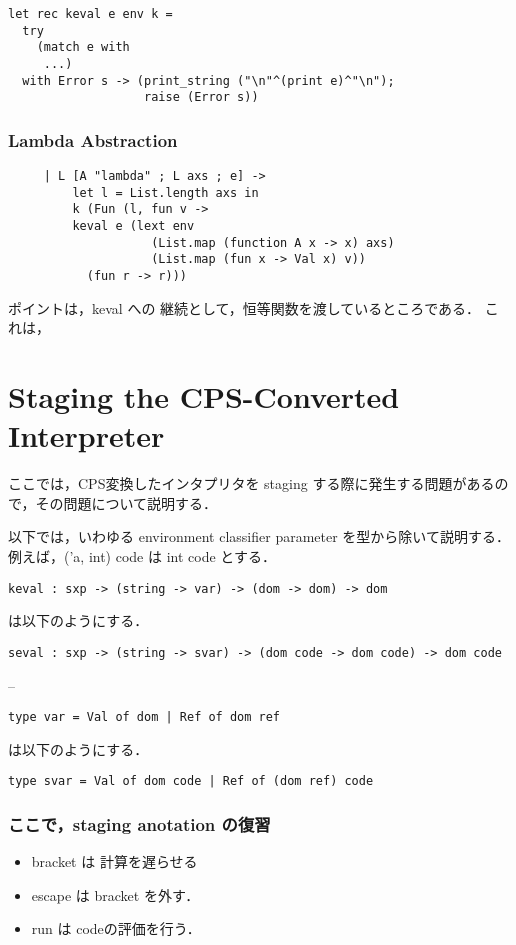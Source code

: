 \documentclass[10pt,a4paper]{jarticle}
\theoremstyle{definition}
\begin{document}
{\small
\begin{verbatim}
let rec keval e env k =
  try
    (match e with
     ...)
  with Error s -> (print_string ("\n"^(print e)^"\n");
                   raise (Error s))
\end{verbatim}}

\subsubsection{Lambda Abstraction}
{\small
\begin{verbatim}
     | L [A "lambda" ; L axs ; e] ->
	     let l = List.length axs in
         k (Fun (l, fun v ->
         keval e (lext env
                    (List.map (function A x -> x) axs)
                    (List.map (fun x -> Val x) v))
           (fun r -> r)))
\end{verbatim}}

ポイントは，keval への 継続として，恒等関数を渡しているところである．
これは，

\section{Staging the CPS-Converted Interpreter}
ここでは，CPS変換したインタプリタを staging する際に発生する問題があるので，その問題について説明する．


以下では，いわゆる environment classifier parameter を型から除いて説明する．
例えば，('a, int) code は int code とする．

{\small
\begin{verbatim}
keval : sxp -> (string -> var) -> (dom -> dom) -> dom
\end{verbatim}}
は以下のようにする．

{\small
\begin{verbatim}
seval : sxp -> (string -> svar) -> (dom code -> dom code) -> dom code
\end{verbatim}}

--
{\small
\begin{verbatim}
type var = Val of dom | Ref of dom ref
\end{verbatim}}
は以下のようにする．

{\small
\begin{verbatim}
type svar = Val of dom code | Ref of (dom ref) code
\end{verbatim}}

\subsubsection{ここで，staging anotation の復習}
\begin{itemize}
\item bracket は 計算を遅らせる
\item escape は bracket を外す．
\item run は codeの評価を行う．
\end{itemize}
\end{document}
